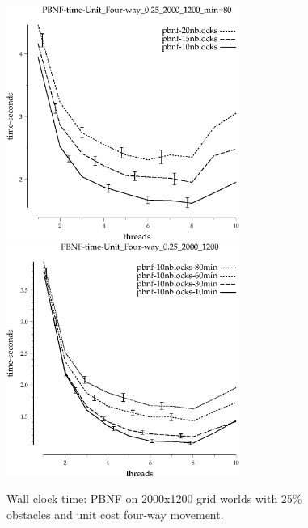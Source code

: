\documentclass{article}
\begin{document}
\begin{appendices}
\begin{figure}[h]
\begin{center}
\includegraphics[width=3in]{../graphs/grid_unit_four-way_0.25_2000_1200/PBNF-time-Unit_Four-way_0.25_2000_1200_min=80.eps}
\includegraphics[width=3in]{../graphs/grid_unit_four-way_0.25_2000_1200/PBNF-time-Unit_Four-way_0.25_2000_1200.eps}
\caption{Wall clock time: PBNF on 2000x1200 grid worlds with 25\%
  obstacles and unit cost four-way movement.}
\end{center}
\end{figure}


\end{appendices}
\end{document}
